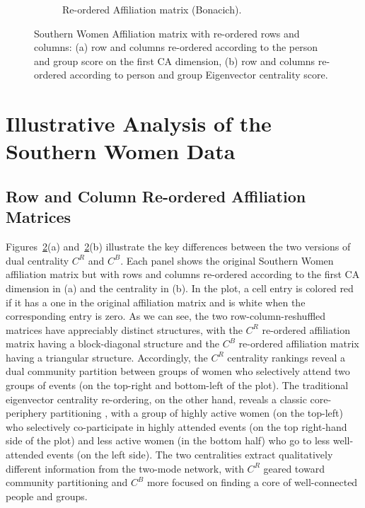 \documentclass[a4paper,fleqn]{cas-sc}
\begin{document}
\begin{figure}[ht!]
\begin{subfigure}[b]{0.45\textwidth}
            \caption{Re-ordered Affiliation matrix (Bonacich).}
            \label{fig:bon-reord}
    \end{subfigure}
    \caption{Southern Women Affiliation matrix with re-ordered rows and columns: (a) row and columns re-ordered according to the person and group score on the first CA dimension, (b) row and columns re-ordered according to person and group Eigenvector centrality score.}
    \label{fig:ca-v-bon}
\end{figure}

\section{Illustrative Analysis of the Southern Women Data} \label{sec:anal}
\subsection{Row and Column Re-ordered Affiliation Matrices}
Figures~\ref{fig:ca-v-bon}(a) and~\ref{fig:ca-v-bon}(b) illustrate the key differences between the two versions of dual centrality $C^R$ and $C^B$. Each panel shows the original Southern Women affiliation matrix but with rows and columns re-ordered according to the first CA dimension in (a) and the \citet{bonacich1991simultaneous} centrality in (b). In the plot, a cell entry is colored red if it has a one in the original affiliation matrix and is white when the corresponding entry is zero. As we can see, the two row-column-reshuffled matrices have appreciably distinct structures, with the $C^R$ re-ordered affiliation matrix having a block-diagonal structure and the $C^B$ re-ordered affiliation matrix having a triangular structure. Accordingly, the $C^R$ centrality rankings reveal a dual community partition between groups of women who selectively attend two groups of events (on the top-right and bottom-left of the plot). The traditional eigenvector centrality re-ordering, on the other hand, reveals a classic core-periphery partitioning \citep{borgatti2000models}, with a group of highly active women (on the top-left) who selectively co-participate in highly attended events (on the top right-hand side of the plot) and less active women (in the bottom half) who go to less well-attended events (on the left side). The two centralities extract qualitatively different information from the two-mode network, with $C^R$ geared toward community partitioning and $C^B$ more focused on finding a core of well-connected people and groups. 
\end{document}
